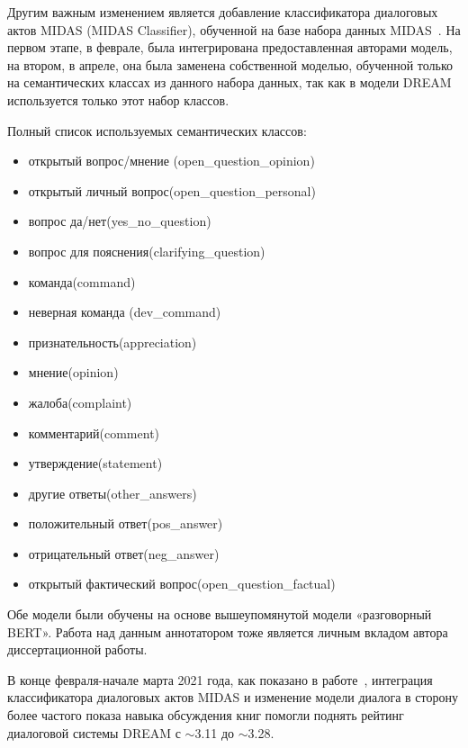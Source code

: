 Другим важным изменением является добавление классификатора диалоговых актов MIDAS (MIDAS Classifier), обученной на базе набора данных MIDAS~\cite{midas}. На первом этапе, в феврале, была интегрирована предоставленная авторами модель, на втором, в апреле, она была заменена собственной моделью, обученной только на семантических классах из данного набора данных, так как в модели {DREAM} используется только этот набор классов.


Полный список используемых семантических классов:
\begin{itemize}
\item открытый вопрос/мнение (open\_question\_opinion)
\item открытый личный вопрос(open\_question\_personal)
\item вопрос да/нет(yes\_no\_question)
\item вопрос для пояснения(clarifying\_question)
\item команда(command)
\item неверная команда (dev\_command)
\item признательность(appreciation)
\item мнение(opinion)
\item жалоба(complaint)
\item комментарий(comment)
\item утверждение(statement)
\item другие ответы(other\_answers)
\item положительный ответ(pos\_answer)
\item отрицательный ответ(neg\_answer)
\item открытый фактический вопрос(open\_question\_factual)
\end{itemize}
Обе модели были обучены на основе вышеупомянутой модели «разговорный BERT».  Работа над данным аннотатором тоже является личным вкладом автора диссертационной работы.

В конце февраля-начале марта 2021 года, как показано  в работе~\cite{dream2}, интеграция классификатора диалоговых актов MIDAS и изменение модели диалога в сторону более частого показа навыка обсуждения книг помогли поднять рейтинг диалоговой системы {DREAM} с $\sim$3.11 до $\sim$3.28.



